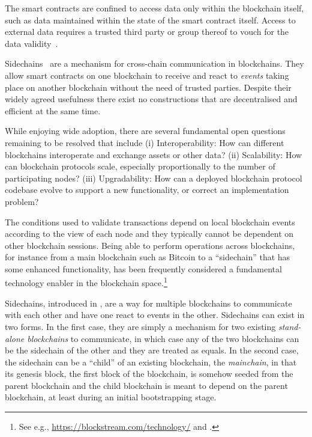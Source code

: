 
The smart contracts are confined to access data only within the blockchain
itself, such as data maintained within the state of the smart contract itself.
Access to external data
requires a trusted third party or group thereof to vouch for the data
validity~\cite{towncrier}.


Sidechains~\cite{sidechains} are a mechanism for cross-chain communication in
blockchains. They allow smart contracts on one blockchain to receive and
react to \textit{events} taking place on another blockchain without the need
of trusted parties. Despite their widely agreed usefulness
there exist no constructions that are decentralised and efficient at the same
time.


While enjoying wide adoption,
there  are several fundamental open questions remaining to be resolved
that include (i)
         Interoperability:
           How can different blockchains interoperate and exchange
           assets or other data?
(ii)  Scalability:
           How can blockchain protocols scale, especially proportionally to the number of           participating nodes?
(iii)
         Upgradability:
           How can a deployed blockchain protocol codebase evolve to support a new
           functionality, or correct an implementation problem?

The conditions used to validate transactions %
depend on local blockchain events according to the view of each node and they
typically cannot be dependent on other blockchain sessions. Being
able to perform operations across blockchains, for instance from a main blockchain
such as Bitcoin to a ``sidechain'' that has some enhanced functionality, has been
frequently considered  a fundamental technology enabler in the blockchain space.\footnote{See
e.g., \url{https://blockstream.com/technology/} and \cite{sidechains}.  }


Sidechains, introduced in \cite{sidechains},  are a
way for multiple blockchains to communicate with each other and have one react
to events in the other. Sidechains can exist in two forms. In the first case, they are simply a mechanism for two
existing \textit{stand-alone blockchains} to communicate, in which case any of
the two blockchains can be the sidechain of the other and they are treated as
equals. In the second case, the
sidechain can be a ``child'' of an existing blockchain, the \textit{mainchain},
in that its genesis block, the first block of the blockchain, is somehow seeded
from the parent blockchain and the child blockchain is meant to depend on the
parent blockchain, at least during an initial bootstrapping stage.

